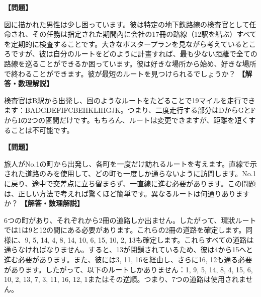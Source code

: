 \documentclass[10pt,a4paper,oneside,openany]{ltjsbook}
\begin{document}
\begin{tcolorbox}[colback=softblue,colframe=primaryblue,title=\textbf{第 242 問：Tube Inspector のパズル （原題: THE TUBE INSPECTOR'S PUZZLE.）},arc=2mm,boxrule=1pt,breakable]
\textbf{【問題】}\par\vspace{0.3em}
図に描かれた男性は少し困っています。彼は特定の地下鉄路線の検査官として任命され、その任務は指定された期間內に会社の17冊の路線（12駅を結ぶ）すべてを定期的に検査することです。大きなポスタープランを見ながら考えているところですが、彼は自分のルートをどのように計畫すれば、最も少ない距離で全ての路線を巡ることができるか困っています。彼は好きな場所から始め、好きな場所で終わることができます。彼が最短のルートを見つけられるでしょうか？
\tcblower
\textbf{【解答・数理解説】}\par\vspace{0.3em}
検査官はB駅から出発し、回のようなルートをたどることで19マイルを走行できます：BADGDEFIFCBEHKLIHGJK。つまり、二度走行する部分はDからGとFからIの2つの區間だけです。もちろん、ルートは変更できますが、距離を短くすることは不可能です。
\end{tcolorbox}

\begin{tcolorbox}[colback=softblue,colframe=primaryblue,title=\textbf{第 243 問：町を訪ねる旅人 （原題: VISITING THE TOWNS.）},arc=2mm,boxrule=1pt,breakable]
\textbf{【問題】}\par\vspace{0.3em}
旅人がNo.1の町から出発し、各町を一度だけ訪れるルートを考えます。直線で示された道路のみを使用して、どの町も一度しか通らないように訪問します。No.1に戻り、途中で交差点に立ち留まらず、一直線に進む必要があります。この問題は、正しい方法で考えれば驚くほど簡単です。異なるルートは何通りありますか？
\tcblower
\textbf{【解答・数理解説】}\par\vspace{0.3em}
6つの町があり、それぞれから2冊の道路しか出ません。したがって、環狀ルートでは1は9と12の間にある必要があります。これらの2冊の道路を確定します。同様に、9, 5, 14, 4, 8, 14, 10, 6, 15, 10, 2, 13も確定します。これらすべての道路は通らなければなりません。すると、13が閉鎖されているため、彼は4から15へと進む必要があります。また、彼には3, 11, 16を経由し、さらに16, 12も通る必要があります。したがって、以下のルートしかありません：1, 9, 5, 14, 8, 4, 15, 6, 10, 2, 13, 7, 3, 11, 16, 12, 1またはその逆順。つまり、7つの道路は使用されません。
\end{tcolorbox}
\end{document}
